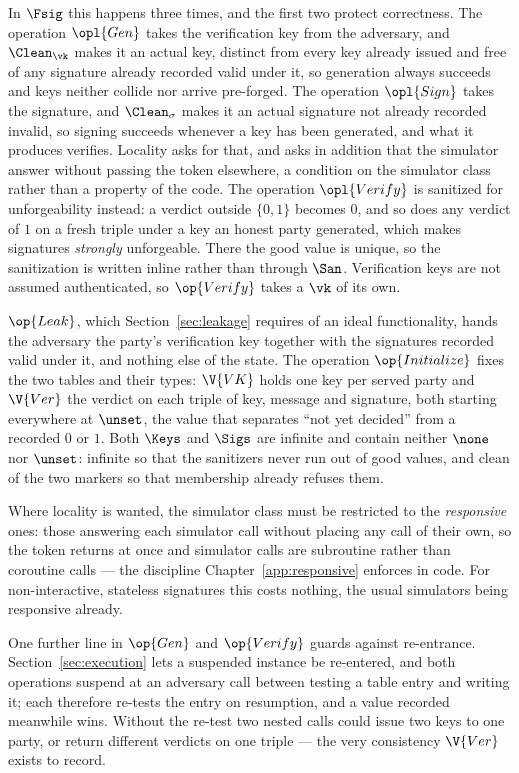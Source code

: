 \documentclass[10pt,oneside,openany]{book}
\theoremstyle{accentdef}
\theoremstyle{accentplain}
\begin{document}
In $\Fsig$ this happens three times, and the first two protect correctness. The operation $\opl{Gen}$ takes the
verification key from the adversary, and $\Clean_{\vk}$ makes it an actual key, distinct from
every key already issued and free of any signature already recorded valid under it, so generation
always succeeds and keys neither collide nor arrive pre-forged. The operation $\opl{Sign}$ takes the signature,
and $\Clean_{\sigma}$ makes it an actual signature not already recorded invalid, so signing
succeeds whenever a key has been generated, and what it produces verifies. Locality asks for that,
and asks in addition that the simulator answer without passing the token elsewhere, a condition on
the simulator class rather than a property of the code. The operation $\opl{Verify}$ is sanitized for
unforgeability instead: a verdict outside $\{0,1\}$ becomes $0$, and so does any verdict of $1$ on
a fresh triple under a key an honest party generated, which makes signatures \emph{strongly}
unforgeable. There the good value is unique, so the sanitization is written inline rather
than through $\San$. Verification keys are not assumed
authenticated, so $\op{Verify}$ takes a $\vk$ of its own.

$\op{Leak}$, which Section~\ref{sec:leakage} requires of an ideal functionality, hands the
adversary the party's verification key together with the signatures recorded valid under it, and
nothing else of the state. The operation $\op{Initialize}$ fixes the two tables and their types: $\V{VK}$ holds
one key per served party and $\V{Ver}$ the verdict on each triple of key, message and signature,
both starting everywhere at $\unset$, the value that separates ``not yet decided'' from a
recorded $0$ or $1$. Both $\Keys$ and $\Sigs$ are infinite and contain neither $\none$ nor
$\unset$: infinite so that the sanitizers never run out of good values, and clean of the two
markers so that membership already refuses them.

Where locality is wanted, the simulator class must be restricted to the \emph{responsive} ones:
those answering each simulator call without placing any call of their own, so the token returns
at once and simulator
calls are subroutine rather than coroutine calls --- the discipline
Chapter~\ref{app:responsive} enforces in code. For non-interactive, stateless signatures this
costs nothing, the usual simulators being responsive already.

One further line in $\op{Gen}$ and $\op{Verify}$ guards against re-entrance.
Section~\ref{sec:execution} lets a suspended instance be re-entered, and both operations suspend
at an adversary call between testing a table entry and writing it; each therefore re-tests the
entry on resumption, and a value recorded meanwhile wins. Without the re-test two nested calls
could issue two keys to one party, or return different verdicts on one triple --- the very
consistency $\V{Ver}$ exists to record.
\end{document}
